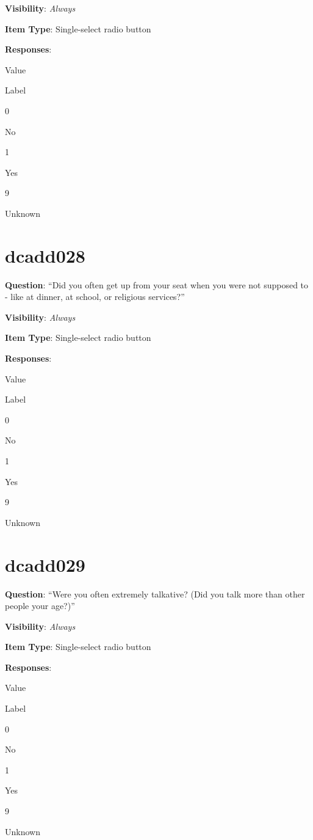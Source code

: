 \documentclass[]{book}
\begin{document}
\textbf{Visibility}: \emph{Always}

\textbf{Item Type}: Single-select radio button

\textbf{Responses}:

Value

Label

0

No

1

Yes

9

Unknown

\hypertarget{dcadd028}{%
\section{dcadd028}\label{dcadd028}}

\textbf{Question}: ``Did you often get up from your seat when you were not supposed to - like at dinner, at school, or religious services?''

\textbf{Visibility}: \emph{Always}

\textbf{Item Type}: Single-select radio button

\textbf{Responses}:

Value

Label

0

No

1

Yes

9

Unknown

\hypertarget{dcadd029}{%
\section{dcadd029}\label{dcadd029}}

\textbf{Question}: ``Were you often extremely talkative? (Did you talk more than other people your age?)''

\textbf{Visibility}: \emph{Always}

\textbf{Item Type}: Single-select radio button

\textbf{Responses}:

Value

Label

0

No

1

Yes

9

Unknown
\end{document}
